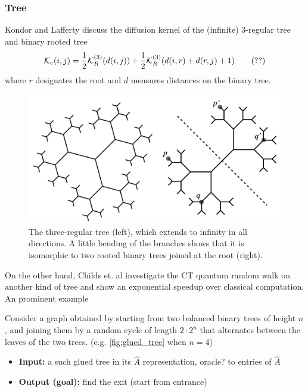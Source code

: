 \subsubsection{Tree}
Kondor and Lafferty \cite{kondorDiffusionKernelsGraphs2002} discuss the diffusion kernel of the (infinite) 3-regular tree and binary rooted tree
\begin{equation}
	\mathcal{K}_{\textup{c}} (i,j) = 
	\frac{1}{2} \mathcal{K}_{R}^{(3)}(d(i,j)) + \frac{1}{2} \mathcal{K}_R^{(3)} \qty(d(i,r)+d(r,j)+1)
	\tag{??}
\end{equation}
where $r$ designates the root and $d$ measures distances on the binary tree.
\begin{figure}[!ht]
	\centering
	\includegraphics[width=.6\linewidth]{regular_tree.png}
	\caption{The three-regular tree (left), which extends to inﬁnity in all directions. A little bending of the branches shows that it is isomorphic to two rooted binary trees joined at the root (right). \cite{kondorDiffusionKernelsGraphs2002}}
\end{figure}
On the other hand, Childs et. al \cite{childsExponentialAlgorithmicSpeedup2003} investigate the CT quantum random walk on another kind of tree and show an exponential speedup over classical computation.
An prominent example
\begin{problem}
	Consider a graph obtained by starting from two balanced binary trees of height $n$, and joining them by a random cycle of length $2\cdot 2^n$ that alternates between the leaves of the two trees. (e.g. \cref{fig:glued_tree} when $n = 4$)
	\begin{itemize}
		\item \textbf{Input:} a such glued tree in its  $\hat{A}$ representation, oracle? to entries of $\hat{A}$
		\item \textbf{Output (goal):} find the exit (start from entrance)
	\end{itemize}
\end{problem}
